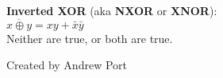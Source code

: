 \documentclass{article}
\begin{document}
\noindent \textbf{Inverted XOR} (aka \textbf{NXOR} or \textbf{XNOR}):\\
$\overline{x \oplus y} = xy + \bar{x}\bar{y}$\\
{\large Neither are true, or both are true.}


\hfill {\color{gray}\normalsize Created by Andrew Port}
\end{document}

